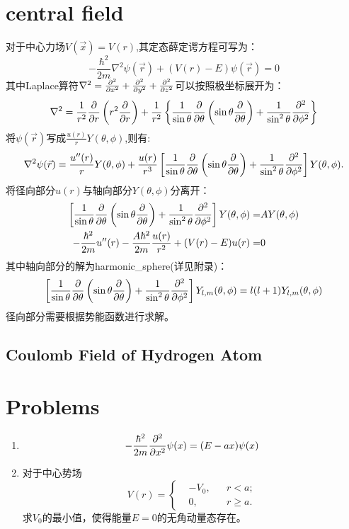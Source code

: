 \section{central field}
对于中心力场$V(\vec{x})=V(r)$,其定态薛定谔方程可写为：
\begin{equation}
    -\frac{\hbar^2}{2m}\nabla^2\psi(\vec{r})+(V(r)-E)\psi(\vec{r})=0
\end{equation}
其中Laplace算符$\nabla^2=\frac{\partial^2 }{\partial x^2}+\frac{\partial^2 }{\partial y^2}+\frac{\partial^2 }{\partial z^2}$可以按照极坐标展开为：
\begin{equation}
    \nabla^2=\frac{1}{r^2}\frac{\partial }{\partial r}\left(r^2\frac{\partial }{\partial r}\right)+\frac{1}{r^2}\left\lbrace \frac{1}{\sin\theta}\frac{\partial }{\partial \theta}\left(\sin\theta\frac{\partial }{\partial \theta}\right)+\frac{1}{\sin^2\theta}\frac{\partial^2 }{\partial \phi^2}\right\rbrace
\end{equation}
将$\psi(\vec{r})$写成$\frac{u(r)}{r}Y(\theta,\phi)$,则有:
\begin{equation}
    \nabla^2\psi(\vec{r})=\frac{u''(r)}{r}Y(\theta,\phi)+\frac{u(r)}{r^3}\left[ \frac{1}{\sin\theta}\frac{\partial }{\partial \theta}\left(\sin\theta\frac{\partial }{\partial \theta}\right)+\frac{1}{\sin^2\theta}\frac{\partial^2 }{\partial \phi^2}\right]Y(\theta,\phi).
\end{equation}
将径向部分$u(r)$与轴向部分$Y(\theta,\phi)$分离开：
\begin{align}
    \left[ \frac{1}{\sin\theta}\frac{\partial }{\partial \theta}\left(\sin\theta\frac{\partial }{\partial \theta}\right)+\frac{1}{\sin^2\theta}\frac{\partial^2 }{\partial \phi^2}\right]Y(\theta,\phi)=&AY(\theta,\phi)\\
    -\frac{\hbar^2}{2m}u''(r)-\frac{A\hbar^2}{2m}\frac{u(r)}{r^2}+(V(r)-E)u(r)=&0
\end{align}
其中轴向部分的解为\gls{harmonic_sphere}(详见附录)：
\begin{equation}
    \left[ \frac{1}{\sin\theta}\frac{\partial }{\partial \theta}\left(\sin\theta\frac{\partial }{\partial \theta}\right)+\frac{1}{\sin^2\theta}\frac{\partial^2 }{\partial \phi^2}\right]Y_{l,m}(\theta,\phi)=l(l+1)Y_{l,m}(\theta,\phi)
\end{equation}
径向部分需要根据势能函数进行求解。

\subsection{Coulomb Field of Hydrogen Atom}

\newpage 
\section*{Problems}
\begin{enumerate}
    \item \begin{equation}
        -\frac{\hbar^2}{2m}\frac{\partial^2 }{\partial x^2}\psi(x)=(E-ax)\psi(x)
    \end{equation}
    \item 对于中心势场
    \begin{equation}
        V(r)=\left\lbrace
        \begin{aligned}
            &-V_0, && r<a;\\
            &0, && r\ge a.
        \end{aligned}\right.
    \end{equation}
    求$V_0$的最小值，使得能量$E=0$的无角动量态存在。
\end{enumerate}

